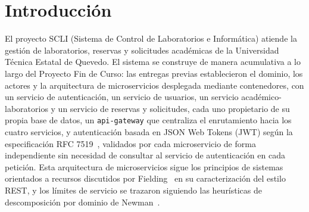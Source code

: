 \documentclass[10pt,twocolumn]{article}
\begin{document}
\begin{abstract}
\textbf{Abstract.} This report documents the third deliverable (E3) of the
capstone project for SCLI (Laboratory and Computing Resources Control
System), focused on the distributed persistence layer and the parallel
analytics pipeline that complete the microservice architecture built in
previous deliverables. A temporal horizontal-fragmentation and
triple-replication schema was designed and implemented over a
three-node CockroachDB cluster dedicated to the reservations microservice,
documented through two architectural decision records (ADR). Cluster fault
tolerance was experimentally verified under single- and double-node
failures, observing continued availability with a two-replica quorum and
unavailability upon quorum loss, consistent with the theoretical guarantees
of the Raft consensus algorithm. A parallel processing pipeline with five
transformations was additionally implemented in PySpark over the
reservations schema, along with a functionally equivalent pandas baseline;
both are complete but, as of this report, without recorded executions of
the comparative protocol. The report documents both achievements and
pending work honestly, and outlines the integration path with the fourth
deliverable.
\end{abstract}

\vspace{6pt}

\section{Introducción}
\label{sec:intro}

El proyecto SCLI (Sistema de Control de Laboratorios e Informática) atiende
la gestión de laboratorios, reservas y solicitudes académicas de la
Universidad Técnica Estatal de Quevedo. El sistema se construye de manera
acumulativa a lo largo del Proyecto Fin de Curso: las entregas previas
establecieron el dominio, los actores y la arquitectura de microservicios
desplegada mediante contenedores, con un servicio de autenticación, un
servicio de usuarios, un servicio académico-laboratorios y un servicio de
reservas y solicitudes, cada uno propietario de su propia base de datos, un
\texttt{api-gateway} que centraliza el enrutamiento hacia los cuatro
servicios, y autenticación basada en JSON Web Tokens (JWT) según la
especificación RFC 7519~\cite{venckauskas2023jwt}, validados por cada microservicio de
forma independiente sin necesidad de consultar al servicio de
autenticación en cada petición. Esta arquitectura de microservicios sigue
los principios de sistemas orientados a recursos discutidos por
Fielding~\cite{li2021microservices} en su caracterización del estilo REST, y los
límites de servicio se trazaron siguiendo las heurísticas de descomposición
por dominio de Newman~\cite{li2021microservices}.
\end{document}

